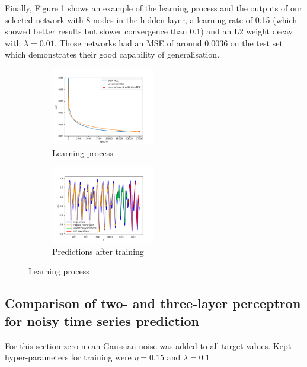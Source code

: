\documentclass[a4paper]{article}
\begin{document}
Finally, Figure \ref{fig:learning_process} shows an example of the learning process and the outputs of our selected network with 8 nodes in the hidden layer, a learning rate of 0.15 (which showed better results but slower convergence than 0.1) and an L2 weight decay with $\lambda = 0.01$. Those networks had an MSE of around 0.0036 on the test set which demonstrates their good capability of generalisation.

\begin{figure}[h!]
	\begin{subfigure}{.5\linewidth}
		\includegraphics[width=170px]{img/4_1_learning_mse.png}
		\centering
		\caption{\small Learning process}
	\end{subfigure}
	\begin{subfigure}{.5\linewidth}
		\centering
		\includegraphics[width=170px]{img/4_1_predictions.png}
		\caption{\small Predictions after training}
	\end{subfigure}
	\caption{Learning process}
	\label{fig:learning_process}
\end{figure}

\subsection{Comparison of two- and three-layer perceptron for noisy time series prediction}
For this section zero-mean Gaussian noise was added to all target values.
Kept hyper-parameters for training were $\eta = 0.15$ and $\lambda = 0.1$
\end{document}
